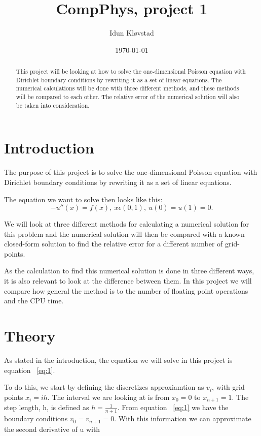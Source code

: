 \documentclass[a4paper,norsk,12pt,oneside]{article}
\title{CompPhys, project 1}
\author{Idun Kløvstad}
\date{\today}
\begin{document}
\maketitle
\newpage 

\begin{abstract}
    This project will be looking at how to solve the one-dimensional Poisson equation with
Dirichlet boundary conditions by rewriting it as a set of linear equations. The numerical 
calculations will be done with three different methods, and these methods will be compared 
to each other. The relative error of the numerical solution will also be taken into
consideration. 
\end{abstract}

\section{Introduction}

The purpose of this project is to solve the one-dimensional Poisson equation with
Dirichlet boundary conditions by rewriting it as a set of linear equations. 

The equation we want to solve then looks like this:
\begin{equation}\label{eq:1}
    -u''(x) = f(x), \ x \epsilon (0,1), \ u(0) = u(1) = 0.
\end{equation}

We will look at three different methods for calculating a numerical solution for this problem and the 
numerical solution will then be compared with a known closed-form solution to find
the relative error for a different number of grid-points.  

As the calculation to find this numerical solution is done
in three different ways, it is also relevant to look at the difference between them.
In this project we will compare how general the method is to the
number of floating point operations and the CPU time.

\section{Theory}

As stated in the introduction, the equation we will solve in this 
project is equation ~\ref{eq:1}. 

To do this, we start by defining the discretizes approxiamtion as \(v_i\), with grid points 
\(x_i = ih\). The interval we are looking at is from \(x_0 = 0\) to \(x_{n+1} = 1\). 
The step length, h, is defined as \(h = \frac{1}{n+1}\). From equation ~\ref{eq:1}
we have the boundary conditions \(v_0 = v_{n+1} = 0\). 
With this information we can approximate the second derivative of u with
\end{document}
